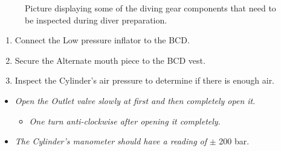 \documentclass[
  12pt,
]{report}
\providecommand{\tightlist}{%
  \setlength{\itemsep}{0pt}\setlength{\parskip}{0pt}}\usepackage{longtable,booktabs,array}
\begin{document}
\begin{figure}[H]

\begin{minipage}[t]{0.50\linewidth}

{\centering 


}

\end{minipage}%
%
\begin{minipage}[t]{0.50\linewidth}

{\centering 


}

\end{minipage}%

\caption{\label{fig-dive-prep}Picture displaying some of the diving gear
components that need to be inspected during diver preparation.}

\end{figure}

\begin{enumerate}
\def\labelenumi{\arabic{enumi}.}
\setcounter{enumi}{6}
\tightlist
\item
  Connect the Low pressure inflator to the BCD.
\item
  Secure the Alternate mouth piece to the BCD vest.
\item
  Inspect the Cylinder's air pressure to determine if there is enough
  air.
\end{enumerate}

\begin{itemize}
\tightlist
\item
  \emph{Open the Outlet valve slowly at first and then completely open
  it}.

  \begin{itemize}
  \tightlist
  \item
    \emph{One turn anti-clockwise after opening it completely}.
  \end{itemize}
\item
  \emph{The Cylinder's manometer should have a reading of} \(\pm\) 200
  bar.
\end{itemize}
\end{document}
